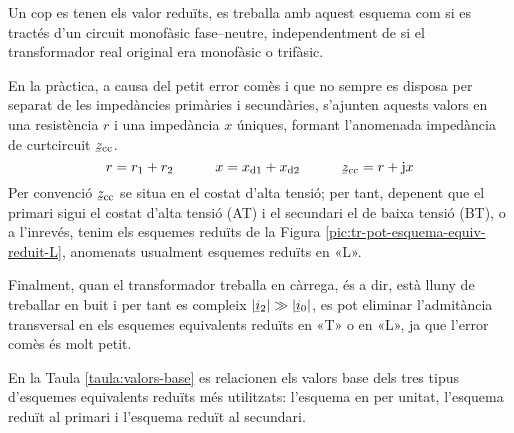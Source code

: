 Un cop es tenen els valor reduïts, es treballa amb aquest esquema com si es tractés d'un circuit monofàsic fase--neutre, independentment de si el transformador real original era monofàsic o trifàsic.

En la pràctica, a causa del petit error comès i que no sempre es disposa per separat de les impedàncies primàries i secundàries,  s'ajunten aquests valors en una resistència $r$ i una  impedància $x$ úniques, formant l'anomenada impedància de curtcircuit $\cmplx{z}\ped{cc}$.
\begin{equation}
    r= r\ped{1}+r\ped{2} \qquad\quad x= x\ped{d1}+x\ped{d2} \qquad\quad \cmplx{z}\ped{cc} = r + \ju x
\end{equation}
Per convenció $\cmplx{z}\ped{cc}$ se situa en el costat d'alta tensió; per tant, depenent que el primari  sigui el costat d'alta tensió (AT) i el secundari el de baixa tensió (BT), o a l'inrevés, tenim els esquemes reduïts de la Figura \vref{pic:tr-pot-esquema-equiv-reduit-L}, anomenats usualment esquemes reduïts en «L».  
\begin{center}
    
    \label{pic:tr-pot-esquema-equiv-reduit-L}
\end{center}

\vspace{-4mm}
Finalment, quan el transformador treballa en càrrega, és a dir, està lluny de treballar en buit i per tant es compleix $|\cmplx{i}_2| \gg |\cmplx{i}_0|$, es pot eliminar l'admitància transversal en els esquemes equivalents reduïts en «T» o en «L», ja que l'error comès és molt petit.

En la  Taula \vref{taula:valors-base} es relacionen els valors base dels tres tipus d'esquemes equivalents reduïts més utilitzats: l'esquema en per unitat, l'esquema reduït al primari i l'esquema reduït al secundari.


